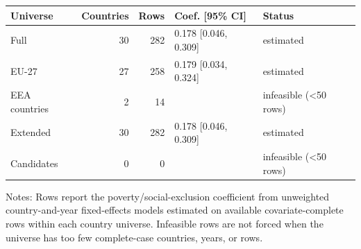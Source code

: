 \begingroup
\small
\begin{tabular}{@{}lrrll@{}}
\toprule
Universe & Countries & Rows & Coef. [95\% CI] & Status \\
\midrule
Full & 30 & 282 & 0.178 [0.046, 0.309] & estimated \\
EU-27 & 27 & 258 & 0.179 [0.034, 0.324] & estimated \\
EEA countries & 2 & 14 &  & infeasible (<50 rows) \\
Extended & 30 & 282 & 0.178 [0.046, 0.309] & estimated \\
Candidates & 0 & 0 &  & infeasible (<50 rows) \\
\bottomrule
\end{tabular}

\vspace{0.2em}
\begin{minipage}{0.92\textwidth}\scriptsize Notes: Rows report the poverty/social-exclusion coefficient from unweighted country-and-year fixed-effects models estimated on available covariate-complete rows within each country universe. Infeasible rows are not forced when the universe has too few complete-case countries, years, or rows.\end{minipage}
\endgroup
